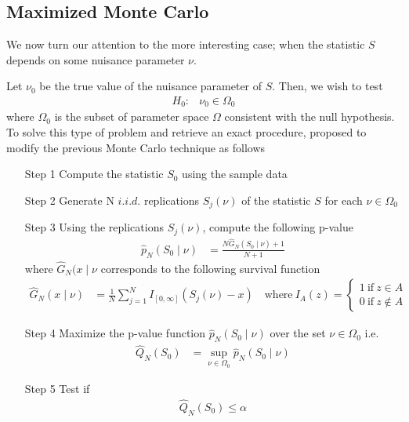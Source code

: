\documentclass[]{article}\usepackage[]{graphicx}\usepackage[]{color}
\begin{document}
\subsection{Maximized Monte Carlo}

We now turn our attention to the more interesting case; when the statistic $S$ depends on some nuisance parameter $\nu$.

Let $\nu_0$ be the true value of the nuisance parameter of $S$. Then, we wish to test
\begin{align}
H_0 : & \nu_0 \in \Omega_0
\end{align}
where $\Omega_0$ is the subset of parameter space $\Omega$ consistent with the null hypothesis. To solve this type of problem and retrieve an exact procedure, \citet{dufour_monte_2006} proposed to modify the previous Monte Carlo technique as follows
\begin{itemize}
\item[Step 1] Compute the statistic $S_0$ using the sample data
\item[Step 2]  Generate N $i.i.d.$ replications $S_{j}(\nu)$ of the statistic $S$ for each $\nu \in \Omega_0$
\item[Step 3]  Using the replications $S_{j}(\nu)$, compute the following p-value
\begin{align}
\hat{p}_{N}(S_{0} \mid \nu) & = \frac{N\hat{G}_{N}(S_{0} \mid \nu)+1}{N+1}
\end{align}
where $\hat{G}_{N}(x \mid \nu$ corresponds to the following survival function
\begin{align}
\hat{G}_{N}(x \mid \nu) & =\frac{1}{N}\sum_{j=1}^{N}I_{[0,\infty]}(S_{j}(\nu)-x) \quad \mathrm{where} \ I_{A}(z)=\left\{\begin{array}{l}
1\ \mathrm{if}\ z\in A\\
0\ \mathrm{if}\ z\not\in A
\end{array}\right.
\end{align}

\item[Step 4] Maximize the p-value function $\hat{p}_{N}(S_{0} \mid \nu)$ over the set $\nu \in \Omega_0$ i.e.
\begin{align}
\hat{Q}_N(S_0) & = \sup_{\nu \in \Omega_0} \hat{p}_{N}(S_{0} \mid \nu)
\end{align}

\item[Step 5] Test if
\begin{align}
\hat{Q}_{N}(S_{0})\leq \alpha
\end{align}
\end{itemize}
\end{document}
